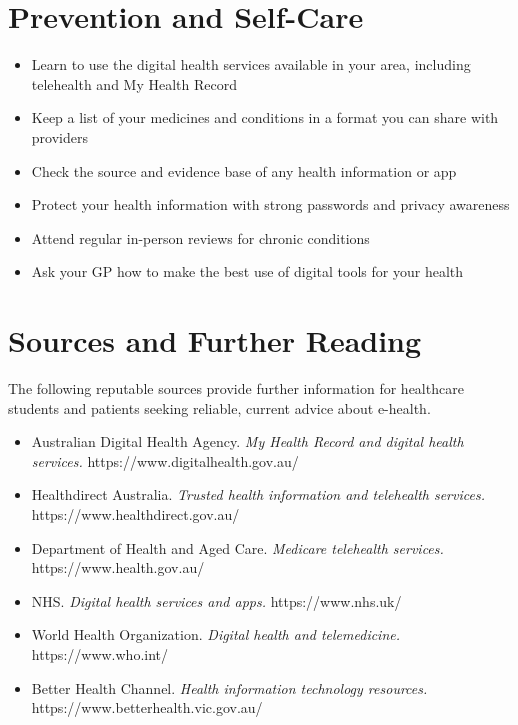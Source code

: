 \section*{Prevention and Self-Care}
\begin{itemize}
    \item Learn to use the digital health services available in your area, including telehealth and My Health Record
    \item Keep a list of your medicines and conditions in a format you can share with providers
    \item Check the source and evidence base of any health information or app
    \item Protect your health information with strong passwords and privacy awareness
    \item Attend regular in-person reviews for chronic conditions
    \item Ask your GP how to make the best use of digital tools for your health
\end{itemize}

\section*{Sources and Further Reading}
The following reputable sources provide further information for healthcare students and patients seeking reliable, current advice about e-health.
\begin{itemize}
    \item Australian Digital Health Agency. \textit{My Health Record and digital health services.} https://www.digitalhealth.gov.au/
    \item Healthdirect Australia. \textit{Trusted health information and telehealth services.} https://www.healthdirect.gov.au/
    \item Department of Health and Aged Care. \textit{Medicare telehealth services.} https://www.health.gov.au/
    \item NHS. \textit{Digital health services and apps.} https://www.nhs.uk/
    \item World Health Organization. \textit{Digital health and telemedicine.} https://www.who.int/
    \item Better Health Channel. \textit{Health information technology resources.} https://www.betterhealth.vic.gov.au/
\end{itemize}
